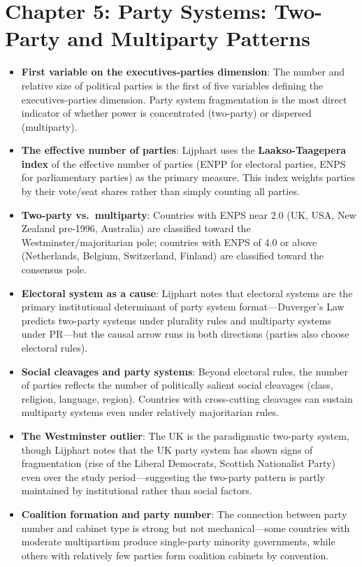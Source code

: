 \documentclass[12pt]{article}
\begin{document}
\section{Chapter 5: Party Systems: Two-Party and Multiparty Patterns}

\begin{itemize}[leftmargin=*, itemsep=4pt]
    \item \textbf{First variable on the executives-parties dimension}: The number and relative size of political parties is the first of five variables defining the executives-parties dimension. Party system fragmentation is the most direct indicator of whether power is concentrated (two-party) or dispersed (multiparty).
    \item \textbf{The effective number of parties}: Lijphart uses the \textbf{Laakso-Taagepera index} of the effective number of parties (ENPP for electoral parties, ENPS for parliamentary parties) as the primary measure. This index weights parties by their vote/seat shares rather than simply counting all parties.
    \item \textbf{Two-party vs.\ multiparty}: Countries with ENPS near 2.0 (UK, USA, New Zealand pre-1996, Australia) are classified toward the Westminster/majoritarian pole; countries with ENPS of 4.0 or above (Netherlands, Belgium, Switzerland, Finland) are classified toward the consensus pole.
    \item \textbf{Electoral system as a cause}: Lijphart notes that electoral systems are the primary institutional determinant of party system format---Duverger's Law predicts two-party systems under plurality rules and multiparty systems under PR---but the causal arrow runs in both directions (parties also choose electoral rules).
    \item \textbf{Social cleavages and party systems}: Beyond electoral rules, the number of parties reflects the number of politically salient social cleavages (class, religion, language, region). Countries with cross-cutting cleavages can sustain multiparty systems even under relatively majoritarian rules.
    \item \textbf{The Westminster outlier}: The UK is the paradigmatic two-party system, though Lijphart notes that the UK party system has shown signs of fragmentation (rise of the Liberal Democrats, Scottish Nationalist Party) even over the study period---suggesting the two-party pattern is partly maintained by institutional rather than social factors.
    \item \textbf{Coalition formation and party number}: The connection between party number and cabinet type is strong but not mechanical---some countries with moderate multipartism produce single-party minority governments, while others with relatively few parties form coalition cabinets by convention.
\end{itemize}
\end{document}
